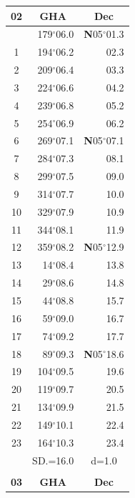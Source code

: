 \documentclass[10pt, a4paper]{report}
\begin{document}
\begin{scriptsize}
\noindent
\begin{tabular*}{0.2\textwidth}[t]{@{\extracolsep{\fill}}|c|rr|}
\hline
\multicolumn{1}{|c|}{\rule{0pt}{2.6ex}\textbf{02}} & \multicolumn{1}{c}{\textbf{GHA}} & \multicolumn{1}{c|}{\textbf{Dec}}\\
\hline\rule{0pt}{2.6ex}\noindent
0 & 179$^\circ$06.0 & \textbf{N}05$^\circ$01.3\\
1 & 194$^\circ$06.2 & 02.3\\
2 & 209$^\circ$06.4 & 03.3\\
3 & 224$^\circ$06.6 & \raisebox{0.24ex}{\boldmath$\cdot$~\boldmath$\cdot$~~}04.2\\
4 & 239$^\circ$06.8 & 05.2\\
5 & 254$^\circ$06.9 & 06.2\\[2Pt]
6 & 269$^\circ$07.1 & \textbf{N}05$^\circ$07.1\\
7 & 284$^\circ$07.3 & 08.1\\
8 & 299$^\circ$07.5 & 09.0\\
9 & 314$^\circ$07.7 & \raisebox{0.24ex}{\boldmath$\cdot$~\boldmath$\cdot$~~}10.0\\
10 & 329$^\circ$07.9 & 10.9\\
11 & 344$^\circ$08.1 & 11.9\\[2Pt]
12 & 359$^\circ$08.2 & \textbf{N}05$^\circ$12.9\\
13 & 14$^\circ$08.4 & 13.8\\
14 & 29$^\circ$08.6 & 14.8\\
15 & 44$^\circ$08.8 & \raisebox{0.24ex}{\boldmath$\cdot$~\boldmath$\cdot$~~}15.7\\
16 & 59$^\circ$09.0 & 16.7\\
17 & 74$^\circ$09.2 & 17.7\\[2Pt]
18 & 89$^\circ$09.3 & \textbf{N}05$^\circ$18.6\\
19 & 104$^\circ$09.5 & 19.6\\
20 & 119$^\circ$09.7 & 20.5\\
21 & 134$^\circ$09.9 & \raisebox{0.24ex}{\boldmath$\cdot$~\boldmath$\cdot$~~}21.5\\
22 & 149$^\circ$10.1 & 22.4\\
23 & 164$^\circ$10.3 & 23.4\\
\hline
\rule{0pt}{2.4ex} & \multicolumn{1}{c}{SD.=16.0} & \multicolumn{1}{c|}{d=1.0}\\
\hline
\multicolumn{1}{c}{}\\[-0.5ex]\hline
\multicolumn{1}{|c|}{\rule{0pt}{2.6ex}\textbf{03}} & \multicolumn{1}{c}{\textbf{GHA}} & \multicolumn{1}{c|}{\textbf{Dec}}\\

\end{tabular*}
\end{scriptsize}
\end{document}
